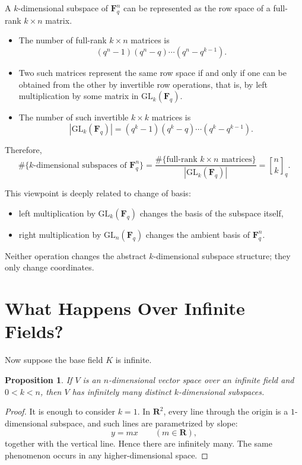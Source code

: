 \documentclass[11pt]{article}
\newtheorem{proposition}[theorem]{Proposition}
\theoremstyle{definition}
\theoremstyle{remark}
\newcommand{\F}{\mathbf{F}}
\newcommand{\R}{\mathbf{R}}
\newcommand{\GL}{\mathrm{GL}}
\newcommand{\qbinom}[2]{\genfrac{[}{]}{0pt}{}{#1}{#2}_q}
\begin{document}
	A \(k\)-dimensional subspace of \(\F_q^n\) can be represented as the row space of a full-rank \(k\times n\) matrix.
	
	\begin{itemize}
		\item The number of full-rank \(k\times n\) matrices is
		\[
		(q^n-1)(q^n-q)\cdots(q^n-q^{k-1}).
		\]
		\item Two such matrices represent the same row space if and only if one can be obtained from the other by invertible row operations, that is, by left multiplication by some matrix in \(\GL_k(\F_q)\).
		\item The number of such invertible \(k\times k\) matrices is
		\[
		|\GL_k(\F_q)|=(q^k-1)(q^k-q)\cdots(q^k-q^{k-1}).
		\]
	\end{itemize}
	
	Therefore,
	\[
	\#\{\text{\(k\)-dimensional subspaces of }\F_q^n\}
	=
	\frac{\#\{\text{full-rank }k\times n\text{ matrices}\}}{|\GL_k(\F_q)|}
	=
	\qbinom{n}{k}.
	\]
	
	This viewpoint is deeply related to change of basis:
	\begin{itemize}
		\item left multiplication by \(\GL_k(\F_q)\) changes the basis of the subspace itself,
		\item right multiplication by \(\GL_n(\F_q)\) changes the ambient basis of \(\F_q^n\).
	\end{itemize}
	
	Neither operation changes the abstract \(k\)-dimensional subspace structure; they only change coordinates.
	
	\section{What Happens Over Infinite Fields?}
	
	Now suppose the base field \(K\) is infinite.
	
	\begin{proposition}
		If \(V\) is an \(n\)-dimensional vector space over an infinite field and \(0<k<n\), then \(V\) has infinitely many distinct \(k\)-dimensional subspaces.
	\end{proposition}
	
	\begin{proof}
		It is enough to consider \(k=1\). In \(\R^2\), every line through the origin is a \(1\)-dimensional subspace, and such lines are parametrized by slope:
		\[
		y=mx \qquad (m\in \R),
		\]
		together with the vertical line. Hence there are infinitely many. The same phenomenon occurs in any higher-dimensional space.
	\end{proof}
	
\end{document}
